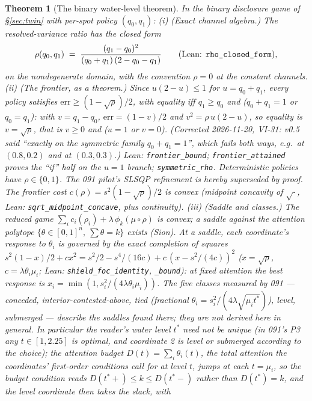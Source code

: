 \documentclass[11pt]{article}
\newtheorem{theorem}{Theorem}
\theoremstyle{definition}
\begin{document}
\begin{theorem}[The binary water-level theorem]\label{thm:binary}
In the binary disclosure game of \S\ref{sec:twin} with per-spot
policy $(q_0, q_1)$:
\emph{(i) (Exact channel algebra.)} The resolved-variance ratio has
the closed form
\[
\rho(q_0, q_1) \;=\;
\frac{(q_1 - q_0)^2}{(q_0 + q_1)\,(2 - q_0 - q_1)}
\qquad\text{(Lean: \texttt{rho\_closed\_form}),}
\]
on the nondegenerate domain, with the convention $\rho = 0$ at the
constant channels.
\emph{(ii) (The frontier, as a theorem.)} Since $u(2-u)\le1$ for
$u = q_0+q_1$, every policy satisfies
$\mathrm{err} \ge (1-\sqrt\rho)/2$, with equality iff $q_1\ge q_0$
and ($q_0+q_1=1$ or $q_0=q_1$): with $v=q_1-q_0$, $\mathrm{err}=(1-v)/2$
and $v^2=\rho\,u(2-u)$, so equality is $v=\sqrt\rho$, that is $v\ge0$
and ($u=1$ or $v=0$). (Corrected 2026-11-20, VI-31: v0.5 said
``exactly on the symmetric family $q_0+q_1=1$'', which fails both ways,
e.g.\ at $(0.8,0.2)$ and at $(0.3,0.3)$.) Lean: \texttt{frontier\_bound};
\texttt{frontier\_attained} proves the ``if'' half on the $u=1$
branch; \texttt{symmetric\_rho}. Deterministic
policies have $\rho\in\{0,1\}$. The 091 pilot's SLSQP refinement is
hereby superseded by proof. The frontier cost
$c(\rho) = s^2(1-\sqrt\rho)/2$ is convex (midpoint concavity of
$\sqrt{\cdot}$, Lean: \texttt{sqrt\_midpoint\_concave}, plus
continuity).
\emph{(iii) (Saddle and classes.)} The reduced game
$\sum_i c_i(\rho_i) + \lambda\,\phi_k(\mu\circ\rho)$ is convex; a
saddle against the attention polytope
$\{\theta\in[0,1]^n,\ \sum\theta = k\}$ exists (Sion). At a saddle,
each coordinate's response to $\theta_i$ is governed by the exact
completion of squares
$s^2(1-x)/2 + cx^2 = s^2/2 - s^4/(16c) + c\,(x - s^2/(4c))^2$
($x=\sqrt\rho$, $c = \lambda\theta_i\mu_i$; Lean:
\texttt{shield\_foc\_identity}, \texttt{\_bound}): at fixed attention
the best response is $x_i=\min(1,s_i^2/(4\lambda\theta_i\mu_i))$. The
five classes measured by 091 --- conceded, interior-contested-above,
tied (fractional $\theta_i = s_i^2/(4\lambda\sqrt{\mu_i t^\ast})$),
level, submerged --- describe the saddles found there; they are
\emph{not derived here in general}. In particular the reader's water
level $t^\ast$ need not be unique (in 091's P3 any $t\in[1,2.25]$ is
optimal, and coordinate 2 is level or submerged according to the
choice); the attention budget $D(t)=\sum_i\theta_i(t)$, the total
attention the coordinates' first-order conditions call for at level
$t$, jumps at each $t=\mu_i$, so the
budget condition reads $D(t^\ast+)\le k\le D(t^\ast-)$ rather than
$D(t^\ast)=k$, and the level coordinate then takes the slack, with

\end{theorem}
\end{document}
